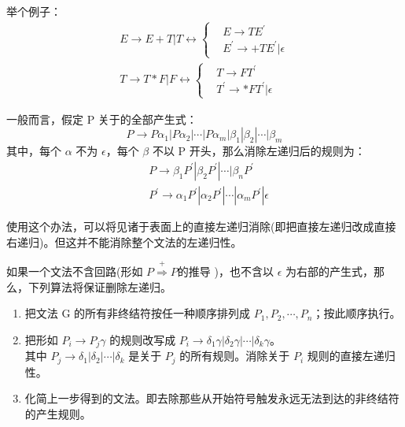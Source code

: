 举个例子：
\begin{equation}
    \begin{aligned}
        E \rightarrow E+T|T \longleftrightarrow 
        \left\{
            \begin{aligned}
                &E \rightarrow TE^{'} \\
                &E^{'} \rightarrow +TE^{'}|\epsilon 
            \end{aligned} 
        \right. \\
        T \rightarrow T*F|F \longleftrightarrow
        \left\{
            \begin{aligned}
                &T \rightarrow FT^{'} \\
                &T^{'} \rightarrow *FT^{'}|\epsilon 
            \end{aligned} 
        \right. \nonumber
    \end{aligned}
\end{equation}

一般而言，假定 P 关于的全部产生式：
\[ P \rightarrow P\alpha_1 | P\alpha_2 | \cdots | P\alpha_m | \beta_1 | \beta_2 | \cdots | \beta_m \]
其中，每个 $\alpha$ 不为 $\epsilon$，每个 $\beta$ 不以 P 开头，那么消除左递归后的规则为：
\begin{equation}
    \begin{aligned}
        &P \rightarrow \beta_1P^{'} | \beta_2P^{'} | \cdots | \beta_nP^{'} \\
        &P^{'} \rightarrow \alpha_1P^{'} | \alpha_2P^{'} | \cdots | \alpha_mP^{'} | \epsilon \nonumber
    \end{aligned}
\end{equation}

使用这个办法，可以将见诸于表面上的直接左递归消除(即把直接左递归改成直接右递归)。但这并不能消除整个文法的左递归性。

如果一个文法不含回路(形如 $P \stackrel{+}{\Rightarrow} P 的推导$ )，也不含以 $\epsilon$ 为右部的产生式，那么，下列算法将保证删除左递归。

\begin{enumerate}
    \item 把文法 G 的所有非终结符按任一种顺序排列成 $P_1,P_2,\cdots,P_n$；按此顺序执行。
    \item 把形如 $P_i \rightarrow P_j \gamma$ 的规则改写成 $P_i \rightarrow \delta_1\gamma | \delta_2\gamma | \cdots | \delta_k\gamma$。\\
    其中 $P_j \rightarrow \delta_1 | \delta_2 | \cdots | \delta_k$ 是关于 $P_j$ 的所有规则。消除关于 $P_i$ 规则的直接左递归性。
    \item 化简上一步得到的文法。即去除那些从开始符号触发永远无法到达的非终结符的产生规则。
\end{enumerate}

